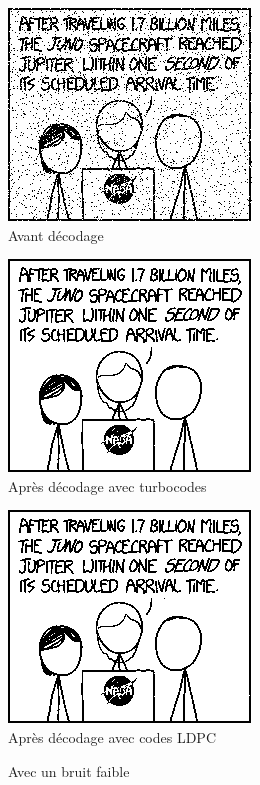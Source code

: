 \documentclass[12pt]{article}
\begin{document}
\begin{figure}
	\begin{minipage}{\textwidth}
		\begin{minipage}{.3\textwidth}
			\centering
			\includegraphics[scale=0.4]{turbo_noisy_60}\\
			Avant d\'ecodage
		\end{minipage}
		\begin{minipage}{.3\textwidth}
			\centering
			\includegraphics[scale=0.4]{turbo_decoded_60}\\
			Apr\`es d\'ecodage avec turbocodes
		\end{minipage}
		\begin{minipage}{.3\textwidth}
			\centering
			\includegraphics[scale=0.4]{ldpc_basic_decoded_60}\\
			Apr\`es d\'ecodage avec codes LDPC
		\end{minipage}
	\end{minipage}
	\caption{Avec un bruit faible}
	\label{fig:faible}
\end{figure}
\end{document}
